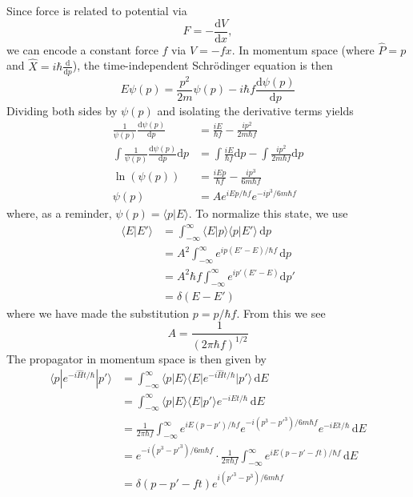 \documentclass[../principles-of-quantum-mechanics.tex]{subfiles}
\begin{document}
\begin{questions}
	\begin{solution}
		Since force is related to potential via
		$$F = -\frac{\mathrm{d}V}{\mathrm{d}x},$$
		we can encode a constant force $f$ via $V = -fx$. In momentum space (where $\hat{P} = p$ and $\hat{X} = i\hbar\frac{\mathrm{d}}{\mathrm{d}p}$), the time-independent Schr\"odinger equation is then
		$$E\psi(p) = \frac{p^2}{2m}\psi(p) - i\hbar f \frac{\mathrm{d}\psi(p)}{\mathrm{d}p}$$
		Dividing both sides by $\psi(p)$ and isolating the derivative terms yields
		\begin{align*}
			\frac{1}{\psi(p)}\frac{\mathrm{d}\psi(p)}{\mathrm{d}p} &= \frac{iE}{\hbar f} - \frac{ip^2}{2m\hbar f} \\
			\int\frac{1}{\psi(p)}\frac{\mathrm{d}\psi(p)}{\mathrm{d}p}\mathrm{d}p &= \int\frac{iE}{\hbar f}\mathrm{d}p - \int\frac{ip^2}{2m\hbar f}\mathrm{d}p \\
			\ln(\psi(p)) &= \frac{iEp}{\hbar f} - \frac{ip^3}{6m\hbar f} \\
			\psi(p) &= Ae^{iEp/\hbar f}e^{-ip^3/6m\hbar f}
		\end{align*}
		where, as a reminder, $\psi(p) = \langle p|E\rangle$. To normalize this state, we use
		\begin{align*}
			\langle E|E'\rangle &= \int_{-\infty}^{\infty}\langle E|p\rangle\langle p|E'\rangle\,\mathrm{d}p \\
			&= A^2\int_{-\infty}^{\infty}e^{ip(E' - E)/\hbar f}\,\mathrm{d}p \\
			&= A^2\hbar f\int_{-\infty}^{\infty}e^{ip'(E' - E)}\mathrm{d}p' \\
			&= \delta(E - E')
		\end{align*}
		where we have made the substitution $p = p/\hbar f$. From this we see
		$$A = \frac{1}{(2\pi\hbar f)^{1/2}}$$
		The propagator in momentum space is then given by
		\begin{align*}
			\langle p|e^{-i\hat{H}t/\hbar}|p'\rangle &= \int_{-\infty}^{\infty}\langle p|E\rangle\langle E|e^{-i\hat{H}t/\hbar}|p'\rangle\,\mathrm{d}E \\
			&= \int_{-\infty}^{\infty}\langle p|E\rangle\langle E|p'\rangle e^{-iEt/\hbar}\,\mathrm{d}E \\
			&= \frac{1}{2\pi\hbar f}\int_{-\infty}^{\infty}e^{iE(p - p')/\hbar f}e^{-i(p^3 - p'^3)/6m\hbar f}e^{-iEt/\hbar}\,\mathrm{d}E \\
			&= e^{-i(p^3 - p'^3)/6m\hbar f}\cdot \frac{1}{2\pi\hbar f}\int_{-\infty}^{\infty}e^{iE(p - p' - ft)/\hbar f}\,\mathrm{d}E \\
			&= \delta(p - p' - ft)e^{i(p'^3 - p^3)/6m\hbar f}

\end{align*}
\end{solution}
\end{questions}
\end{document}
